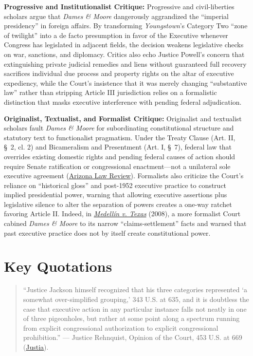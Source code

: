 \documentclass[12pt]{article}
\begin{document}
\textbf{Progressive and Institutionalist Critique:} Progressive and civil-liberties scholars argue that \textit{Dames \& Moore} dangerously aggrandized the ``imperial presidency'' in foreign affairs. By transforming \textit{Youngstown}'s Category Two ``zone of twilight'' into a de facto presumption in favor of the Executive whenever Congress has legislated in adjacent fields, the decision weakens legislative checks on war, sanctions, and diplomacy. Critics also echo Justice Powell's concern that extinguishing private judicial remedies and liens without guaranteed full recovery sacrifices individual due process and property rights on the altar of executive expediency, while the Court's insistence that it was merely changing ``substantive law'' rather than stripping Article III jurisdiction relies on a formalistic distinction that masks executive interference with pending federal adjudication.

\textbf{Originalist, Textualist, and Formalist Critique:} Originalist and textualist scholars fault \textit{Dames \& Moore} for subordinating constitutional structure and statutory text to functionalist pragmatism. Under the Treaty Clause (Art. II, \S\ 2, cl. 2) and Bicameralism and Presentment (Art. I, \S\ 7), federal law that overrides existing domestic rights and pending federal causes of action should require Senate ratification or congressional enactment---not a unilateral sole executive agreement (\href{https://arizonalawreview.org/pdf/51-4/51arizlrev1035.pdf}{Arizona Law Review}). Formalists also criticize the Court's reliance on ``historical gloss'' and post-1952 executive practice to construct implied presidential power, warning that allowing executive assertions plus legislative silence to alter the separation of powers creates a one-way ratchet favoring Article II. Indeed, in \href{https://supreme.justia.com/cases/federal/us/552/491/}{\textit{Medell\'in v. Texas}} (2008), a more formalist Court cabined \textit{Dames \& Moore} to its narrow ``claims-settlement'' facts and warned that past executive practice does not by itself create constitutional power.

\section{Key Quotations}
\begin{quote}
``Justice Jackson himself recognized that his three categories represented `a somewhat over-simplified grouping,' 343 U.S. at 635, and it is doubtless the case that executive action in any particular instance falls not neatly in one of three pigeonholes, but rather at some point along a spectrum running from explicit congressional authorization to explicit congressional prohibition.'' --- Justice Rehnquist, Opinion of the Court, 453 U.S. at 669 (\href{https://supreme.justia.com/cases/federal/us/453/654/}{Justia}).
\end{quote}
\end{document}
